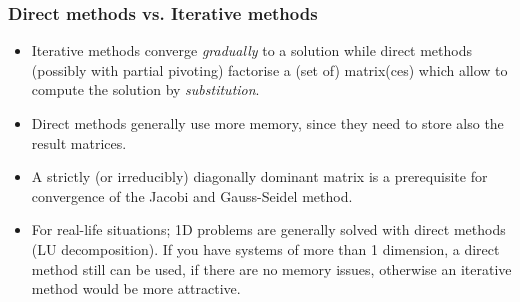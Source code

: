 \begin{frame}[fragile]
  \frametitle{Direct methods vs. Iterative methods}
  \begin{itemize}
    \item Iterative methods converge \emph{gradually} to a solution while direct methods (possibly with partial pivoting) factorise a (set of) matrix(ces) which allow to compute the solution by \emph{substitution}.
    \item Direct methods generally use more memory, since they need to store also the result matrices.
    \item A strictly (or irreducibly) diagonally dominant matrix is a prerequisite for convergence of the Jacobi and Gauss-Seidel method.
    \item For real-life situations; 1D problems are generally solved with direct methods (LU decomposition). If you have systems of more than 1 dimension, a direct method still can be used, if there are no memory issues, otherwise an iterative method would be more attractive.
\end{itemize}
\end{frame}